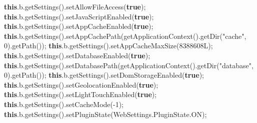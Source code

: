 \documentclass[
]{article}
\newenvironment{Shaded}{}{}
\newcommand{\DecValTok}[1]{\textcolor[rgb]{0.25,0.63,0.44}{#1}}
\newcommand{\FunctionTok}[1]{\textcolor[rgb]{0.02,0.16,0.49}{#1}}
\newcommand{\KeywordTok}[1]{\textcolor[rgb]{0.00,0.44,0.13}{\textbf{#1}}}
\newcommand{\NormalTok}[1]{#1}
\newcommand{\OperatorTok}[1]{\textcolor[rgb]{0.40,0.40,0.40}{#1}}
\newcommand{\StringTok}[1]{\textcolor[rgb]{0.25,0.44,0.63}{#1}}
\begin{document}
\begin{Shaded}
\begin{Highlighting}[]
        \KeywordTok{this}\OperatorTok{.}\FunctionTok{b}\OperatorTok{.}\FunctionTok{getSettings}\OperatorTok{().}\FunctionTok{setAllowFileAccess}\OperatorTok{(}\KeywordTok{true}\OperatorTok{);}
        \KeywordTok{this}\OperatorTok{.}\FunctionTok{b}\OperatorTok{.}\FunctionTok{getSettings}\OperatorTok{().}\FunctionTok{setJavaScriptEnabled}\OperatorTok{(}\KeywordTok{true}\OperatorTok{);}
        \KeywordTok{this}\OperatorTok{.}\FunctionTok{b}\OperatorTok{.}\FunctionTok{getSettings}\OperatorTok{().}\FunctionTok{setAppCacheEnabled}\OperatorTok{(}\KeywordTok{true}\OperatorTok{);}
        \KeywordTok{this}\OperatorTok{.}\FunctionTok{b}\OperatorTok{.}\FunctionTok{getSettings}\OperatorTok{().}\FunctionTok{setAppCachePath}\OperatorTok{(}\FunctionTok{getApplicationContext}\OperatorTok{().}\FunctionTok{getDir}\OperatorTok{(}\StringTok{"cache"}\OperatorTok{,} \DecValTok{0}\OperatorTok{).}\FunctionTok{getPath}\OperatorTok{());}
        \KeywordTok{this}\OperatorTok{.}\FunctionTok{b}\OperatorTok{.}\FunctionTok{getSettings}\OperatorTok{().}\FunctionTok{setAppCacheMaxSize}\OperatorTok{(}\DecValTok{8388608L}\OperatorTok{);}
        \KeywordTok{this}\OperatorTok{.}\FunctionTok{b}\OperatorTok{.}\FunctionTok{getSettings}\OperatorTok{().}\FunctionTok{setDatabaseEnabled}\OperatorTok{(}\KeywordTok{true}\OperatorTok{);}
        \KeywordTok{this}\OperatorTok{.}\FunctionTok{b}\OperatorTok{.}\FunctionTok{getSettings}\OperatorTok{().}\FunctionTok{setDatabasePath}\OperatorTok{(}\FunctionTok{getApplicationContext}\OperatorTok{().}\FunctionTok{getDir}\OperatorTok{(}\StringTok{"database"}\OperatorTok{,} \DecValTok{0}\OperatorTok{).}\FunctionTok{getPath}\OperatorTok{());}
        \KeywordTok{this}\OperatorTok{.}\FunctionTok{b}\OperatorTok{.}\FunctionTok{getSettings}\OperatorTok{().}\FunctionTok{setDomStorageEnabled}\OperatorTok{(}\KeywordTok{true}\OperatorTok{);}
        \KeywordTok{this}\OperatorTok{.}\FunctionTok{b}\OperatorTok{.}\FunctionTok{getSettings}\OperatorTok{().}\FunctionTok{setGeolocationEnabled}\OperatorTok{(}\KeywordTok{true}\OperatorTok{);}
        \KeywordTok{this}\OperatorTok{.}\FunctionTok{b}\OperatorTok{.}\FunctionTok{getSettings}\OperatorTok{().}\FunctionTok{setLightTouchEnabled}\OperatorTok{(}\KeywordTok{true}\OperatorTok{);}
        \KeywordTok{this}\OperatorTok{.}\FunctionTok{b}\OperatorTok{.}\FunctionTok{getSettings}\OperatorTok{().}\FunctionTok{setCacheMode}\OperatorTok{({-}}\DecValTok{1}\OperatorTok{);}
        \KeywordTok{this}\OperatorTok{.}\FunctionTok{b}\OperatorTok{.}\FunctionTok{getSettings}\OperatorTok{().}\FunctionTok{setPluginState}\OperatorTok{(}\NormalTok{WebSettings}\OperatorTok{.}\FunctionTok{PluginState}\OperatorTok{.}\FunctionTok{ON}\OperatorTok{);}

\end{Highlighting}
\end{Shaded}
\end{document}
